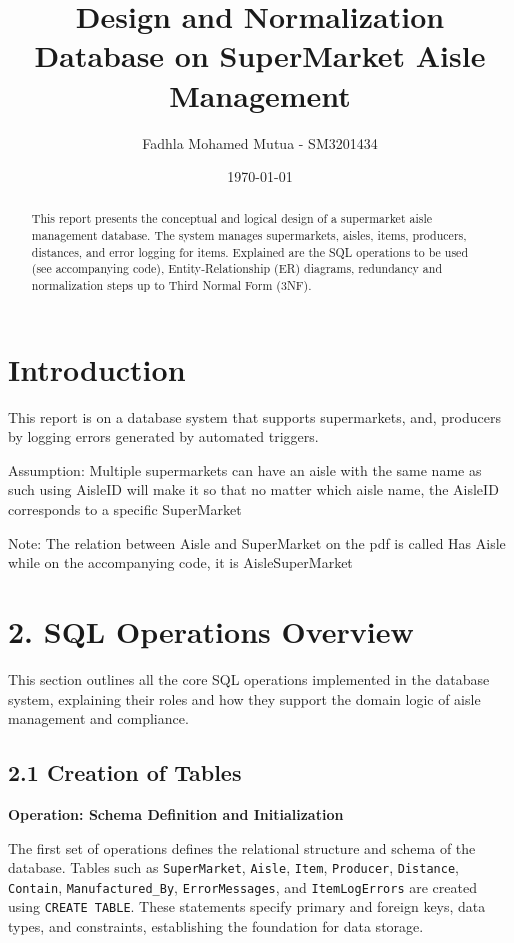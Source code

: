 \documentclass[a4paper,12pt]{article}
\title{Design and Normalization Database on SuperMarket Aisle Management}
\author{Fadhla Mohamed Mutua - SM3201434}
\date{\today}
\begin{document}
\maketitle

\begin{abstract}
This report presents the conceptual and logical design of a supermarket aisle management database. The system manages supermarkets, aisles, items, producers, distances, and error logging for items. Explained are the SQL operations to be used (see accompanying code), Entity-Relationship (ER) diagrams, redundancy and normalization steps up to Third Normal Form (3NF).
\end{abstract}

\newpage
\tableofcontents
\newpage

\section{Introduction}
This report is on a database system that supports supermarkets, and, producers by logging errors generated by automated triggers.

Assumption: Multiple supermarkets can have an aisle with the same name as such using AisleID will make it so that no matter which aisle name, the AisleID corresponds to a specific SuperMarket

Note: The relation between Aisle and SuperMarket on the pdf is called Has Aisle while on the accompanying code, it is AisleSuperMarket

\section*{2. SQL Operations Overview}

This section outlines all the core SQL operations implemented in the database system, explaining their roles and how they support the domain logic of aisle management and compliance.

\subsection*{2.1 Creation of Tables}

\textbf{Operation: Schema Definition and Initialization}

The first set of operations defines the relational structure and schema of the database. Tables such as \texttt{SuperMarket}, \texttt{Aisle}, \texttt{Item}, \texttt{Producer}, \texttt{Distance}, \texttt{Contain}, \texttt{Manufactured\_By}, \texttt{ErrorMessages}, and \texttt{ItemLogErrors} are created using \texttt{CREATE TABLE}. These statements specify primary and foreign keys, data types, and constraints, establishing the foundation for data storage.
\end{document}
